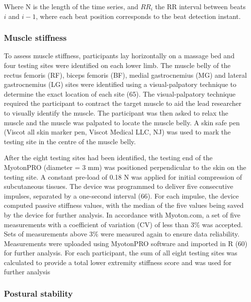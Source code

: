 \documentclass[
  english,
  man]{apa6}
\begin{document}
Where N is the length of the time series, and \(RR_i\) the RR interval between beats \(i\) and \(i-1\), where each beat position corresponds to the beat detection instant.

\hypertarget{muscle-stiffness}{%
\subsubsection{Muscle stiffness}\label{muscle-stiffness}}

To assess muscle stiffness, participants lay horizontally on a massage bed and four testing sites were identified on each lower limb.
The muscle belly of the rectus femoris (RF), biceps femoris (BF), medial gastrocnemius (MG) and lateral gastrocnemius (LG) sites were identified using a visual-palpatory technique to determine the exact location of each site (65).
The visual-palpatory technique required the participant to contract the target muscle to aid the lead researcher to visually identify the muscle.
The participant was then asked to relax the muscle and the muscle was palpated to locate the muscle belly. A skin safe pen (Viscot all skin marker pen, Viscot Medical LLC, NJ) was used to mark the testing site in the centre of the muscle belly.

After the eight testing sites had been identified, the testing end of the MyotonPRO (diameter = 3 mm) was positioned perpendicular to the skin on the testing site.
A constant pre-load of 0.18 N was applied for initial compression of subcutaneous tissues.
The device was programmed to deliver five consecutive impulses, separated by a one-second interval (66).
For each impulse, the device computed passive stiffness values, with the median of the five values being saved by the device for further analysis. In accordance with Myoton.com, a set of five measurements with a coefficient of variation (CV) of less than 3\% was accepted. Sets of measurements above 3\% were measured again to ensure data reliability.
Measurements were uploaded using MyotonPRO software and imported in R (60) for further analysis. For each participant, the sum of all eight testing sites was calculated to provide a total lower extremity stiffness score and was used for further analysis

\hypertarget{postural-stability-1}{%
\subsubsection{Postural stability}\label{postural-stability-1}}
\end{document}
